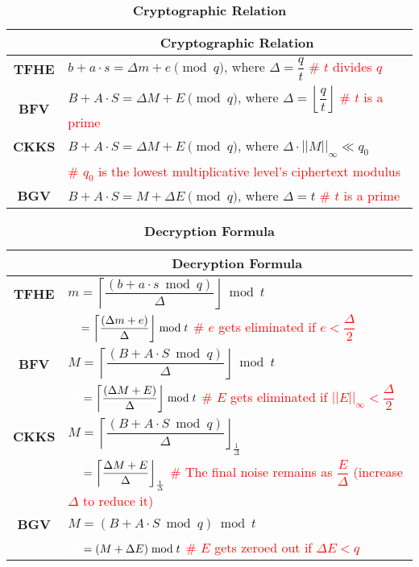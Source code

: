 \begin{table}[h]
\begin{tabular}{|c||l|}
\hline
&\multicolumn{1}{c|}{\textbf{Cryptographic Relation}}\\\hline\hline
\textbf{TFHE}&$b + a\cdot s = \Delta m + e \pmod q$, \text{ } where $\Delta = \dfrac{q}{t}$  \text{ } \textcolor{red}{\# $t$ divides $q$}\\\hline
\textbf{BFV}&$B + A\cdot S = \Delta M + E \pmod q$, \text{ } where $\Delta = \left\lfloor\dfrac{q}{t}\right\rfloor$ \text{ } \textcolor{red}{\# $t$ is a prime}\\\hline
\textbf{CKKS}&$B + A\cdot S = \Delta M + E \pmod q$, \text{ } where $\Delta \cdot ||M||_\infty \ll q_0$\\
& \text{ } \textcolor{red}{\# $q_0$ is the lowest multiplicative level's ciphertext modulus}\\\hline
\textbf{BGV}&$B + A\cdot S = M + \Delta E \pmod q$, \text{ } where $\Delta = t$  \text{ } \textcolor{red}{\# $t$ is a prime}\\\hline
\end{tabular}
\caption{\textbf{Cryptographic Relation}}
\end{table}


\begin{table}[h]
\begin{tabular}{|c||l|}
\hline
&\multicolumn{1}{c|}{\textbf{Decryption Formula}}\\\hline\hline
\textbf{TFHE}&$m = \left\lceil\dfrac{(b + a\cdot s \bmod q)}{\Delta}\right\rfloor \bmod t$\\
&$\textcolor{white}{m} = \left\lceil\dfrac{(\Delta m + e)}{\Delta}\right\rfloor \bmod t$ \text{ } \textcolor{red}{ \# $e$ gets eliminated if $e < \dfrac{\Delta}{2}$}\\\hline
\textbf{BFV}&$M = \left\lceil\dfrac{(B + A\cdot S \bmod q)}{\Delta}\right\rfloor  \bmod t$\\
&$\textcolor{white}{M} = \left\lceil\dfrac{(\Delta M + E)}{\Delta}\right\rfloor  \bmod t$ \text{ } \textcolor{red}{ \# $E$ gets eliminated if $||E||_\infty < \dfrac{\Delta}{2}$}\\\hline
\textbf{CKKS}&$M = \left\lceil\dfrac{(B + A\cdot S \bmod q)}{\Delta}\right\rfloor_{\frac{1}{\Delta}}$\\
&$\textcolor{white}{M} = \left\lceil\dfrac{\Delta M + E}{\Delta}\right\rfloor_{\frac{1}{\Delta}}$ \text{ } \textcolor{red}{ \# The final noise remains as $\dfrac{E}{\Delta}$ (increase $\Delta$ to reduce it)}\\\hline
\textbf{BGV}&$M = (B + A\cdot S \bmod q) \bmod t$\\
&$\textcolor{white}{M} = (M + \Delta E) \bmod t$ \text{ } \textcolor{red}{ \# $E$ gets zeroed out if $\Delta E < q$}\\\hline
\end{tabular}
\caption{\textbf{Decryption Formula}}
\end{table}

